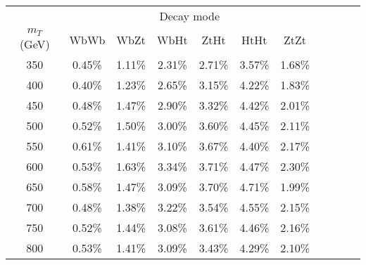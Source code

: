 \begin{tabular}{c c c c c c c c c c c } \toprule
 & \multicolumn{6}{c}{ Decay mode } \\
 $m_{T}$ (GeV)  & WbWb 		 & WbZt 		 & WbHt 		 & ZtHt 		 & HtHt 		 & ZtZt 		 \\ \midrule 
 350 & 0.45\% & 1.11\% & 2.31\% & 2.71\% & 3.57\% & 1.68\%\\ 
400 & 0.40\% & 1.23\% & 2.65\% & 3.15\% & 4.22\% & 1.83\%\\ 
450 & 0.48\% & 1.47\% & 2.90\% & 3.32\% & 4.42\% & 2.01\%\\ 
500 & 0.52\% & 1.50\% & 3.00\% & 3.60\% & 4.45\% & 2.11\%\\ 
550 & 0.61\% & 1.41\% & 3.10\% & 3.67\% & 4.40\% & 2.17\%\\ 
600 & 0.53\% & 1.63\% & 3.34\% & 3.71\% & 4.47\% & 2.30\%\\ 
650 & 0.58\% & 1.47\% & 3.09\% & 3.70\% & 4.71\% & 1.99\%\\ 
700 & 0.48\% & 1.38\% & 3.22\% & 3.54\% & 4.55\% & 2.15\%\\ 
750 & 0.52\% & 1.44\% & 3.08\% & 3.61\% & 4.46\% & 2.16\%\\ 
800 & 0.53\% & 1.41\% & 3.09\% & 3.43\% & 4.29\% & 2.10\%\\ 
\bottomrule\end{tabular}